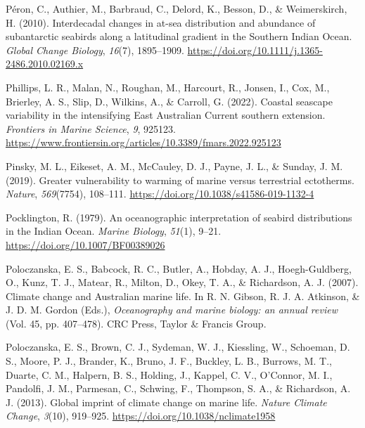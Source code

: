 \documentclass{article}
\newlength{\cslhangindent}
\newlength{\cslentryspacingunit} %
\newenvironment{CSLReferences}[2] %
 {%
  \setlength{\parindent}{0pt}
  \ifodd #1
  \let\oldpar\par
  \def\par{\hangindent=\cslhangindent\oldpar}
  \fi
  \setlength{\parskip}{#2\cslentryspacingunit}
 }%
 {}
\begin{document}
\begin{linenumbers}
\begin{CSLReferences}{1}{0}
\leavevmode{}%
Péron, C., Authier, M., Barbraud, C., Delord, K., Besson, D., \& Weimerskirch, H. (2010). Interdecadal changes in at-sea distribution and abundance of subantarctic seabirds along a latitudinal gradient in the Southern Indian Ocean. \emph{Global Change Biology}, \emph{16}(7), 1895--1909. \url{https://doi.org/10.1111/j.1365-2486.2010.02169.x}

\leavevmode{}%
Phillips, L. R., Malan, N., Roughan, M., Harcourt, R., Jonsen, I., Cox, M., Brierley, A. S., Slip, D., Wilkins, A., \& Carroll, G. (2022). Coastal seascape variability in the intensifying {E}ast {A}ustralian {C}urrent southern extension. \emph{Frontiers in Marine Science}, \emph{9}, 925123. \url{https://www.frontiersin.org/articles/10.3389/fmars.2022.925123}

\leavevmode{}%
Pinsky, M. L., Eikeset, A. M., McCauley, D. J., Payne, J. L., \& Sunday, J. M. (2019). Greater vulnerability to warming of marine versus terrestrial ectotherms. \emph{Nature}, \emph{569}(7754), 108--111. \url{https://doi.org/10.1038/s41586-019-1132-4}

\leavevmode{}%
Pocklington, R. (1979). An oceanographic interpretation of seabird distributions in the Indian Ocean. \emph{Marine Biology}, \emph{51}(1), 9--21. \url{https://doi.org/10.1007/BF00389026}

\leavevmode{}%
Poloczanska, E. S., Babcock, R. C., Butler, A., Hobday, A. J., Hoegh-Guldberg, O., Kunz, T. J., Matear, R., Milton, D., Okey, T. A., \& Richardson, A. J. (2007). Climate change and Australian marine life. In R. N. Gibson, R. J. A. Atkinson, \& J. D. M. Gordon (Eds.), \emph{Oceanography and marine biology: an annual review} (Vol. 45, pp. 407--478). CRC Press, Taylor \& Francis Group.

\leavevmode{}%
Poloczanska, E. S., Brown, C. J., Sydeman, W. J., Kiessling, W., Schoeman, D. S., Moore, P. J., Brander, K., Bruno, J. F., Buckley, L. B., Burrows, M. T., Duarte, C. M., Halpern, B. S., Holding, J., Kappel, C. V., O'Connor, M. I., Pandolfi, J. M., Parmesan, C., Schwing, F., Thompson, S. A., \& Richardson, A. J. (2013). Global imprint of climate change on marine life. \emph{Nature Climate Change}, \emph{3}(10), 919--925. \url{https://doi.org/10.1038/nclimate1958}


\end{CSLReferences}
\end{linenumbers}
\end{document}
